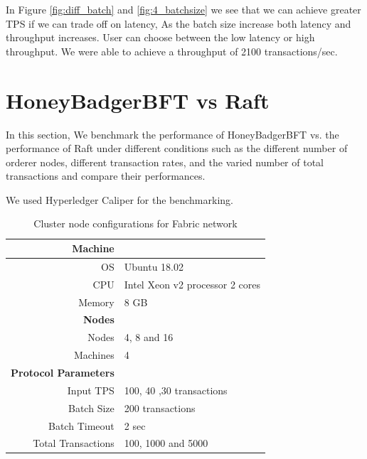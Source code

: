 In Figure \ref{fig:diff_batch} and \ref{fig:4_batchsize} we see that we can achieve greater TPS if we can trade off on latency, As the batch size increase both latency and throughput increases.
User can choose between the low latency or high throughput. We were able to achieve a throughput of 2100 transactions/sec.




\section{HoneyBadgerBFT vs Raft}
In this section, We benchmark the performance of HoneyBadgerBFT vs. the performance of Raft under different conditions such as the different number of orderer nodes, different transaction rates, and the varied number of total transactions and compare their performances.

We used Hyperledger Caliper \cite{caliper_doc}\cite{caliper_white_paper} for the benchmarking. 
  \begin{table}[!h]
  \centering
\begin{tabular}{ |r|  l |}
\hline
 \textbf{Machine} & \\
 \hline
  OS & Ubuntu 18.02 \\  
   CPU & Intel Xeon v2 processor 2 cores \\
  Memory &8 GB\\
  \hline
  \textbf{Nodes}&\\
  \hline
Nodes  &4, 8 and 16\\
Machines & 4\\
\hline
\textbf{Protocol Parameters} & \\
\hline
Input TPS & 100, 40 ,30 transactions\\
Batch Size & 200 transactions\\
Batch Timeout & 2 sec\\
Total Transactions& 100, 1000 and 5000\\
  \hline
\end{tabular}
\caption{Cluster node configurations for Fabric network}

\end{table}
\clearpage
